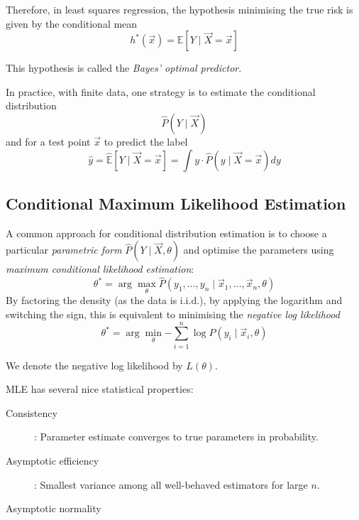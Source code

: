 Therefore, in least squares regression,
the hypothesis minimising the true risk
is given by the conditional mean
\begin{equation*}
    h^*(\vec{x}) = \mathbb{E}[Y \mid \vec{X} = \vec{x}]
\end{equation*}

This hypothesis is called the
\emph{Bayes' optimal predictor}.

In practice, with finite data, one strategy
is to estimate the conditional distribution
\begin{equation*}
    \hat{P}(Y \mid \vec{X})
\end{equation*}
and for a test point $\vec{x}$ to
predict the label
\begin{equation*}
    \hat{y} = \hat{\mathbb{E}}[Y \mid \vec{X} = \vec{x}]
    = \int{y \cdot \hat{P}(y \mid \vec{X} = \vec{x}) dy}
\end{equation*}


\subsection{Conditional Maximum Likelihood Estimation}
A common approach for conditional distribution estimation
is to choose a particular \emph{parametric form}
$\hat{P}(Y \mid \vec{X}, \theta)$
and optimise the parameters using
\emph{maximum conditional likelihood estimation}:
\begin{equation*}
    \theta^* = \arg\max_\theta{
        \hat{P}(y_1, \dotsc, y_n \mid \vec{x}_1, \dotsc, \vec{x}_n, \theta)
    }
\end{equation*}
By factoring the density (as the data is i.i.d.),
by applying the logarithm and switching the sign,
this is equivalent to minimising the
\emph{negative log likelihood}
\begin{equation*}
    \theta^* = \arg\min_\theta{
        -\sum_{i=1}^n{\log{\hat{P}(y_i \mid \vec{x}_i, \theta)}}
    }
\end{equation*}

We denote the negative log likelihood by $L(\theta)$.

MLE has several nice statistical properties:
\begin{description}
    \item[Consistency]: Parameter estimate
    converges to true parameters in probability.
    \item[Asymptotic efficiency]: Smallest
    variance among all well-behaved estimators
    for large $n$.
    \item[Asymptotic normality]
\end{description}



